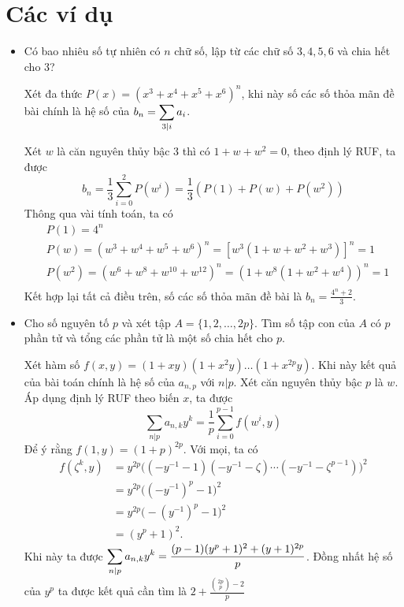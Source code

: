 \documentclass[12pt]{scrartcl}
\begin{document}
\section{\Large Các ví dụ}
\begin{itemize}[label=, leftmargin=0em, itemsep=0.5em]
  \item \begin{bt} Có bao nhiêu số tự nhiên có $n$ chữ số, lập từ các chữ số $3,4,5,6$ và chia hết cho 3?
  \end{bt}
  \begin{sol}
    Xét đa thức $P(x) = (x^3 + x^4 + x^5 + x^6)^n$, khi này số các số thỏa mãn đề bài chính là hệ số của $b_n = \displaystyle\sum_{3 | i} a_i$.
    
    Xét $w$ là căn nguyên thủy bậc 3 thì có $1 + w + w^2 =0$, theo định lý RUF, ta được
    \[
    b_n = \frac{1}{3}\sum_{i = 0}^2P(w^i) =\frac{1}{3}\left( P(1) + P(w) + P(w^2)\right)
    \]
    Thông qua vài tính toán, ta có 
    \[
    \begin{aligned}
      &P(1) =4^n\\
      &P(w) = (w^3 +w^4 + w^5 +w^6)^n = \left[w^3(1 + w + w^2 + w^3)\right]^n = 1\\
      &P(w^2) = (w^6 + w^8 + w^{10} + w^{12})^n = (1 + w^8(1 + w^2 + w^4))^n = 1\\
    \end{aligned}
    \]
    Kết hợp lại tất cả điều trên, số các số thỏa mãn đề bài là $\boxed{b_n = \frac{4^n + 2}{3}}$.
  \end{sol}
  \item \begin{bt}
    Cho số nguyên tố $p$ và xét tập $A =\{1,2,\dots,2p\}$. Tìm số tập con của $A$ có $p$ phần tử và tổng các phần tử là một số chia hết cho $p$.
  \end{bt}
  \begin{sol}
    Xét hàm số $f(x,y) = (1 + xy)(1 + x^2y)\dots(1 + x^{2p}y)$. Khi này kết quả của bài toán chính là hệ số của $a_{n,p}$ với $n | p$. Xét căn nguyên thủy bậc $p$ là $w$. Áp dụng định lý RUF theo biến $x$, ta được
    \[
      \sum_{n | p}a_{n,k}y^k = \frac{1}{p}\sum_{i = 0}^{p - 1}f(w^i,y)
    \]
    Để ý rằng $f(1,y) = (1 + p)^{2p}$. Với mọi, ta có 
    \begin{align*}
      f(\zeta^k,y) &= y^{2p}\Big((-y^{-1} - 1)(-y^{-1} - \zeta) \cdots (-y^{-1} - \zeta^{p-1})\Big)^2 \\
      &= y^{2p}\Big((-y^{-1})^p - 1\Big)^2 \\
      &= y^{2p}\Big(-(y^{-1})^p - 1\Big)^2 \\
      &= (y^p + 1)^2.
  \end{align*}
  Khi này ta được  $\dsum_{n | p}a_{n,k}y^k =\frac{(p-1)(y^p + 1)^2 + (y+1)^{2p}}p$. Đồng nhất hệ số của $y^p$ ta được kết quả cần tìm là $\boxed{2 + \tfrac{\binom{2p}p - 2}p}$
  \end{sol}


\end{itemize}
\end{document}
